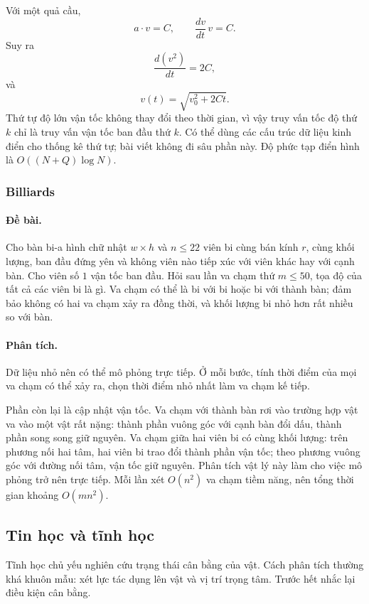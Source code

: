 \documentclass[11pt]{article}
\begin{document}
Với một quả cầu,
\[
  a\cdot v=C,\qquad
  \frac{dv}{dt}\,v=C.
\]
Suy ra
\[
  \frac{d(v^2)}{dt}=2C,
\]
và
\[
  v(t)=\sqrt{v_0^2+2Ct}.
\]
Thứ tự độ lớn vận tốc không thay đổi theo thời gian, vì vậy truy vấn tốc độ
thứ \(k\) chỉ là truy vấn vận tốc ban đầu thứ \(k\). Có thể dùng các cấu trúc
dữ liệu kinh điển cho thống kê thứ tự; bài viết không đi sâu phần này. Độ phức
tạp điển hình là \(O((N+Q)\log N)\).

\subsubsection{Billiards}

\paragraph{Đề bài.}
Cho bàn bi-a hình chữ nhật \(w\times h\) và \(n\le 22\) viên bi cùng bán kính
\(r\), cùng khối lượng, ban đầu đứng yên và không viên nào tiếp xúc với viên
khác hay với cạnh bàn. Cho viên số \(1\) vận tốc ban đầu. Hỏi sau lần va chạm
thứ \(m\le 50\), tọa độ của tất cả các viên bi là gì. Va chạm có thể là bi với
bi hoặc bi với thành bàn; đảm bảo không có hai va chạm xảy ra đồng thời, và
khối lượng bi nhỏ hơn rất nhiều so với bàn.

\paragraph{Phân tích.}
Dữ liệu nhỏ nên có thể mô phỏng trực tiếp. Ở mỗi bước, tính thời điểm của mọi
va chạm có thể xảy ra, chọn thời điểm nhỏ nhất làm va chạm kế tiếp.

Phần còn lại là cập nhật vận tốc. Va chạm với thành bàn rơi vào trường hợp vật
va vào một vật rất nặng: thành phần vuông góc với cạnh bàn đổi dấu, thành phần
song song giữ nguyên. Va chạm giữa hai viên bi có cùng khối lượng: trên phương
nối hai tâm, hai viên bi trao đổi thành phần vận tốc; theo phương vuông góc với
đường nối tâm, vận tốc giữ nguyên. Phân tích vật lý này làm cho việc mô phỏng
trở nên trực tiếp. Mỗi lần xét \(O(n^2)\) va chạm tiềm năng, nên tổng thời gian
khoảng \(O(mn^2)\).

\subsection{Tin học và tĩnh học}

Tĩnh học chủ yếu nghiên cứu trạng thái cân bằng của vật. Cách phân tích thường
khá khuôn mẫu: xét lực tác dụng lên vật và vị trí trọng tâm. Trước hết nhắc lại
điều kiện cân bằng.
\end{document}
